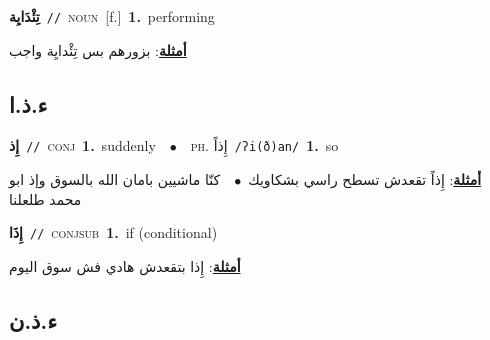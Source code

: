 \documentclass[10pt,a4paper,twoside]{article} %
\begin{document}
\begin{multicols}{2}
{\setlength\topsep{0pt}\textbf{\foreignlanguage{arabic}{تِئْدَايِة}}\ {\color{gray}\texttt{//}\color{black}}\ \textsc{noun}\ [f.]\ \textbf{1.}~performing\  \begin{flushright}\color{gray}\foreignlanguage{arabic}{\textbf{\underline{\foreignlanguage{arabic}{أمثلة}}}: بزورهم بس تِئْدايِة واجب}\end{flushright}\color{black}} \vspace{2mm}

\vspace{-3mm}
\subsection*{\color{blue}\foreignlanguage{arabic}{ء.ذ.ا}\color{blue}{}} 

{\setlength\topsep{0pt}\textbf{\foreignlanguage{arabic}{إِذ}}\ {\color{gray}\texttt{//}\color{black}}\ \textsc{conj}\ \textbf{1.}~suddenly\ \ $\bullet$\ \ \textsc{ph.} \color{gray} \foreignlanguage{arabic}{إِذاً}\color{black}\ {\color{gray}\texttt{/{\sffamily ʔi(ð)an}/}\color{black}}\ \textbf{1.}~so\  \begin{flushright}\color{gray}\foreignlanguage{arabic}{\textbf{\underline{\foreignlanguage{arabic}{أمثلة}}}: إِذاً تقعدش تسطح راسي بشكاويك\ $\bullet$\ \  كنّا ماشيين بامان الله بالسوق وإذ ابو محمد طلعلنا}\end{flushright}\color{black}} \vspace{2mm}

{\setlength\topsep{0pt}\textbf{\foreignlanguage{arabic}{إِذَا}}\ {\color{gray}\texttt{//}\color{black}}\ \textsc{conj\textunderscore sub}\ \textbf{1.}~if (conditional)\  \begin{flushright}\color{gray}\foreignlanguage{arabic}{\textbf{\underline{\foreignlanguage{arabic}{أمثلة}}}: إِذا بتقعدش هادي فش سوق اليوم}\end{flushright}\color{black}} \vspace{2mm}

\vspace{-3mm}
\subsection*{\color{blue}\foreignlanguage{arabic}{ء.ذ.ن}\color{blue}{}} 


\end{multicols}
\end{document}
